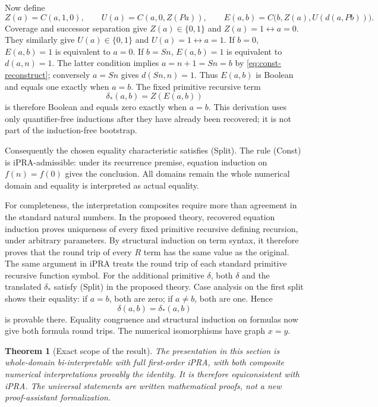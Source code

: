 \documentclass[11pt]{article}
\newtheorem{theorem}{Theorem}[section]
\theoremstyle{definition}\newtheorem{definition}[theorem]{Definition}
\begin{document}
Now define
\[
 Z(a)=C(a,1,0),\qquad U(a)=C(a,0,Z(Pa)),\qquad
 E(a,b)=C\bigl(b,Z(a),U(d(a,Pb))\bigr).
\]
Coverage and successor separation give $Z(a)\in\{0,1\}$ and
$Z(a)=1\leftrightarrow a=0$.  They similarly give
$U(a)\in\{0,1\}$ and $U(a)=1\leftrightarrow a=1$.
If $b=0$, $E(a,b)=1$ is equivalent to $a=0$.
If $b=Sn$, $E(a,b)=1$ is equivalent to $d(a,n)=1$.
The latter condition implies $a=n+1=Sn=b$ by
\eqref{eq:const-reconstruct}; conversely $a=Sn$ gives $d(Sn,n)=1$.
Thus $E(a,b)$ is Boolean and equals one exactly when $a=b$.
The fixed primitive recursive term
\[
                         \delta_*(a,b)=Z(E(a,b))
\]
is therefore Boolean and equals zero exactly when $a=b$.  This
derivation uses only quantifier-free inductions after they have already
been recovered; it is not part of the induction-free bootstrap.

Consequently the chosen equality characteristic satisfies
\textup{(Split)}.  The rule \textup{(Const)} is iPRA-admissible:
under its recurrence premise, equation induction on
$f(n)=f(0)$ gives the conclusion.  All domains remain the whole
numerical domain and equality is interpreted as actual equality.

For completeness, the interpretation composites require more than
agreement in the standard natural numbers.  In the proposed theory,
recovered equation induction proves uniqueness of every fixed primitive
recursive defining recursion, under arbitrary parameters.  By structural
induction on term syntax, it therefore proves that the round trip of
every $R$ term has the same value as the original.  The same argument in
iPRA treats the round trip of each standard primitive recursive function
symbol.  For the additional primitive $\delta$, both $\delta$ and the
translated $\delta_*$ satisfy \textup{(Split)} in the proposed theory.
Case analysis on the first split shows their equality: if $a=b$, both
are zero; if $a\ne b$, both are one.  Hence
\[
                         \delta(a,b)=\delta_*(a,b)
\]
is provable there.  Equality congruence and structural induction on
formulas now give both formula round trips.  The numerical isomorphisms
have graph $x=y$.

\begin{theorem}[Exact scope of the result]
The presentation in this section is whole-domain bi-interpretable with
full first-order iPRA, with both composite numerical interpretations
provably the identity.  It is therefore equiconsistent with iPRA.
The universal statements are written mathematical proofs, not a new
proof-assistant formalization.
\end{theorem}
\end{document}
